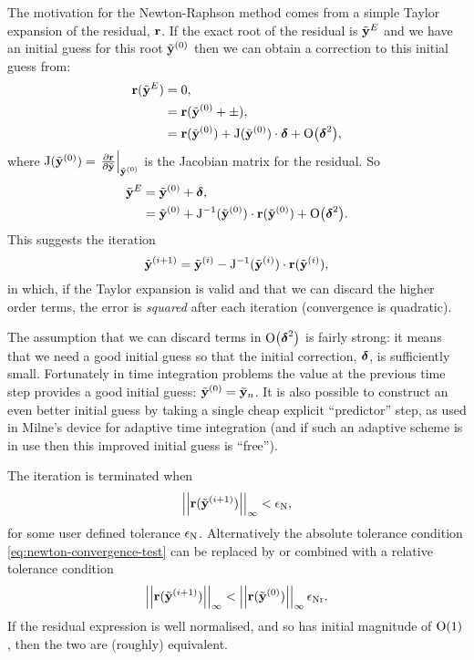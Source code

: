The motivation for the Newton-Raphson method comes from a simple Taylor expansion of the residual, $\mathbf{r}$.
If the exact root of the residual is $\tilde{\mathbf{y}}^E$ and we have an initial guess for this root ${\tilde{\mathbf{y}}}^{(0)}$ then we can obtain a correction to this initial guess from:
\begin{equation}
  \begin{aligned}
    \mathbf{r}(\tilde{\mathbf{y}}^E) &= 0, \\
    &= \mathbf{r}({\tilde{\mathbf{y}}}^{(0)} + \pm), \\
    &= \mathbf{r}({\tilde{\mathbf{y}}}^{(0)}) + \mathrm{J}({\tilde{\mathbf{y}}}^{(0)}) \cdot \boldsymbol{\delta} + \text{O}{\left( \boldsymbol{\delta}^2 \right)},
  \end{aligned}
\end{equation}
where $\mathrm{J}({\tilde{\mathbf{y}}}^{(0)}) = {\left. {\frac{\partial \mathbf{r}}{\partial \tilde{\mathbf{y}}}} \right|_{{\tilde{\mathbf{y}}}^{(0)}}}$ is the Jacobian matrix for the residual.
So
\begin{equation}
  \begin{aligned}
    \label{eq:49}
    \tilde{\mathbf{y}}^E &= {\tilde{\mathbf{y}}}^{(0)} + \boldsymbol{\delta}, \\
    &= {\tilde{\mathbf{y}}}^{(0)} + \mathrm{J}^{-1}({\tilde{\mathbf{y}}}^{(0)}) \cdot \mathbf{r}({\tilde{\mathbf{y}}}^{(0)}) + \text{O}{\left( \boldsymbol{\delta}^2 \right)}.
  \end{aligned}
\end{equation}
This suggests the iteration
\begin{equation}
  {\tilde{\mathbf{y}}}^{(i+1)} = {\tilde{\mathbf{y}}}^{(i)} - \mathrm{J}^{-1}({\tilde{\mathbf{y}}}^{(i)}) \cdot \mathbf{r}({\tilde{\mathbf{y}}}^{(i)}),
\end{equation}
in which, if the Taylor expansion is valid and that we can discard the higher order terms, the error is \emph{squared} after each iteration (\ie convergence is quadratic).

The assumption that we can discard terms in $\text{O}{\left( \boldsymbol{\delta}^2 \right)}$ is fairly strong: it means that we need a good initial guess so that the initial correction, $\boldsymbol{\delta}$, is sufficiently small.
Fortunately in time integration problems the value at the previous time step provides a good initial guess: ${\tilde{\mathbf{y}}}^{(0)} = \tilde{\mathbf{y}}_n$.
It is also possible to construct an even better initial guess by taking a single cheap explicit ``predictor'' step, as used in Milne's device for adaptive time integration (and if such an adaptive scheme is in use then this improved initial guess is ``free'').

The iteration is terminated when
\begin{equation}
  \left| \left| \mathbf{r}({\tilde{\mathbf{y}}}^{(i+1)}) \right| \right|_{\infty} < \epsilon_{\text{N}},
\label{eq:newton-convergence-test}
\end{equation}
for some user defined tolerance $\epsilon_{\text{N}}$.
Alternatively the absolute tolerance condition \cref{eq:newton-convergence-test} can be replaced by or combined with a relative tolerance condition
\begin{equation}
  \left| \left| \mathbf{r}({\tilde{\mathbf{y}}}^{(i+1)}) \right| \right|_{\infty} < \left| \left| \mathbf{r}({\tilde{\mathbf{y}}}^{(0)}) \right| \right|_{\infty} \epsilon_{\text{Nr}}.
\end{equation}
If the residual expression is well normalised, and so has initial magnitude of $\text{O}{\left( 1 \right)}$, then the two are (roughly) equivalent. 

